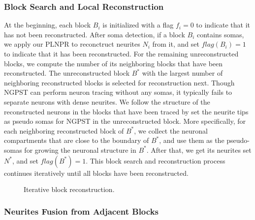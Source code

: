\subsubsection{Block Search and Local Reconstruction}
\label{sec:trace}

%
At the beginning, each block $B_{i}$ is initialized with a flag $ f_i = 0$ to indicate that it has not been reconstructed.
%
After soma detection, if a block $ B_{i}$ contains somas, we apply our PLNPR to reconctruct neurites $ N_{i} $ from it, and set $flag(B_{i})= 1 $ to indicate that it has been reconstructed.
%
For the remaining unreconstructed blocks, we compute the number of its neighboring blocks that have been reconstructed. 
The unreconstructed block $B^*$ with the largest number of neighboring reconstructed blocks is selected for reconstruction next.
%
Though NGPST can perform neuron tracing without any somas, it typically fails to separate neurons with dense neurites.
%
We follow the structure of the reconstructed neurons in the blocks that have been traced by set the neurite tips as pseudo somas for NGPST in the unreconstructed block.
%
More specifically, for each neighboring reconstructed block of $ B^* $, we collect the neuronal compartments that are close to the boundary of $ B^* $, and use them as the pseudo-somas for growing the neuronal structure in $B^*$.
After that, we get its neurites set $ N^* $, and set $ flag(B^*) = 1 $.
%
This block search and reconstruction process continues iteratively until all blocks have been reconstructed.



\begin{figure}
	\centering
	\vspace{1cm}
	\caption{Iterative block reconstruction. }
	\label{fig:blocksearch}
\end{figure}

\subsubsection{Neurites Fusion from Adjacent Blocks}
\label{sec:fusion}

